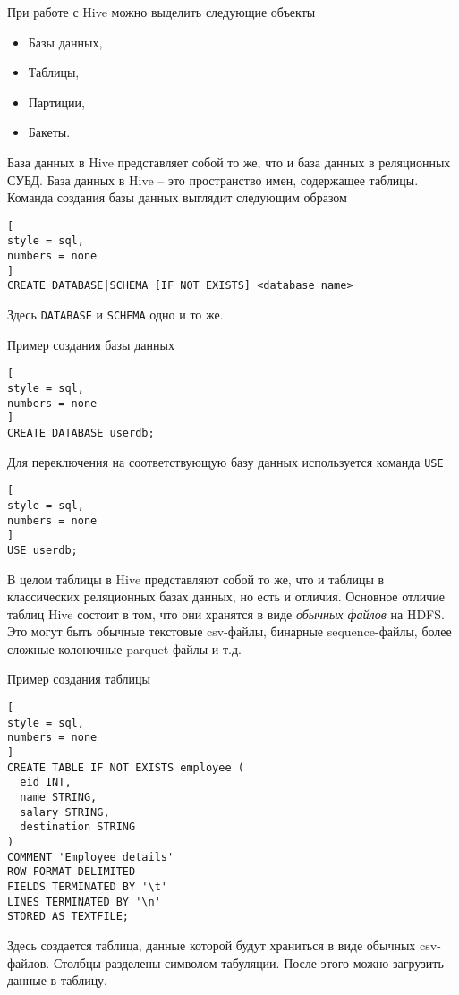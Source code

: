 \documentclass[%
	11pt,
	a4paper,
	utf8,
		]{article}
\begin{document}
При работе с Hive можно выделить следующие объекты
\begin{itemize}
	\item Базы данных,
	
	\item Таблицы,
	
	\item Партиции,
	
	\item Бакеты.
\end{itemize}

База данных в Hive представляет собой то же, что и база данных в реляционных СУБД. База данных в Hive -- это пространство имен, содержащее таблицы. Команда создания базы данных выглядит следующим образом
\begin{lstlisting}[
style = sql,
numbers = none	
]
CREATE DATABASE|SCHEMA [IF NOT EXISTS] <database name>
\end{lstlisting}

Здесь \texttt{DATABASE} и \texttt{SCHEMA} одно и то же.

Пример создания базы данных
\begin{lstlisting}[
style = sql,
numbers = none	
]
CREATE DATABASE userdb;
\end{lstlisting}

Для переключения на соответствующую базу данных используется команда \texttt{USE}
\begin{lstlisting}[
style = sql,
numbers = none	
]
USE userdb;
\end{lstlisting}

В целом таблицы в Hive представляют собой то же, что и таблицы в классических реляционных базах данных, но есть и отличия. Основное отличие таблиц Hive состоит в том, что они хранятся в виде \emph{обычных файлов} на HDFS. Это могут быть обычные текстовые csv-файлы, бинарные sequence-файлы, более сложные колоночные parquet-файлы и т.д.

Пример создания таблицы
\begin{lstlisting}[
style = sql,
numbers = none	
]
CREATE TABLE IF NOT EXISTS employee (
  eid INT,
  name STRING,
  salary STRING,
  destination STRING
)
COMMENT 'Employee details'
ROW FORMAT DELIMITED
FIELDS TERMINATED BY '\t'
LINES TERMINATED BY '\n'
STORED AS TEXTFILE;
\end{lstlisting}

Здесь создается таблица, данные которой будут храниться в виде обычных csv-файлов. Столбцы разделены символом табуляции. После этого можно загрузить данные в таблицу.
\end{document}
